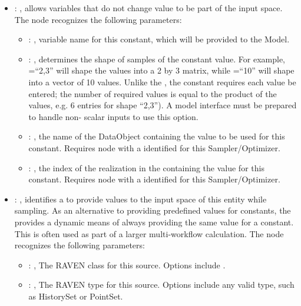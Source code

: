 \begin{itemize}
    \item {}: , 
      allows variables that do not change value to be part of the input space.
      The  node recognizes the following parameters:
        \begin{itemize}
          \item {}: , 
            variable name for this constant, which will be provided to the Model.
          \item {}: , 
            determines the shape of samples of the constant value.               For example,
            =``2,3'' will shape the values into a 2 by 3               matrix, while
            =``10'' will shape into a vector of 10 values.               Unlike the
            , the constant requires each value be entered; the number
            of required values is equal to the product of the  values, e.g. 6 entries
            for shape ``2,3'').               \nb A model interface must be prepared to handle non-
            scalar inputs to use this option.
          \item {}: , 
            the name of the DataObject containing the value to be used for this constant.
            Requires  node with a  identified for this
            Sampler/Optimizer.
          \item {}: , 
            the index of the realization in the  
            containing the value for this constant. Requires  node with
            a  identified for this Sampler/Optimizer.
      \end{itemize}

    \item {}: , 
      identifies a  to provide  values to the input
      space of this entity while sampling. As an alternative to providing predefined values
      for constants, the  provides a dynamic means of always providing
      the same value for a constant. This is often used as part of a larger multi-workflow
      calculation.
      The  node recognizes the following parameters:
        \begin{itemize}
          \item {}: , 
            The RAVEN class for this source. Options include .
          \item {}: , 
            The RAVEN type for this source. Options include any valid  type,
            such as HistorySet or PointSet.
      \end{itemize}


\end{itemize}
